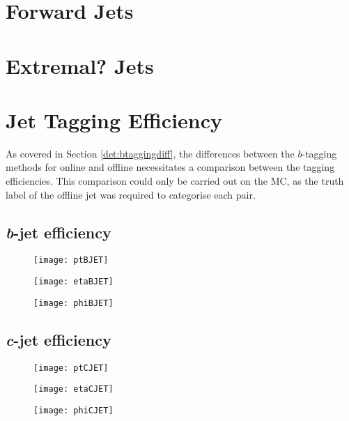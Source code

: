 \section{Forward Jets}

\section{Extremal?  Jets}

\section{Jet Tagging Efficiency}

	As covered in Section \ref{det:btaggingdiff}, the differences between the $b$-tagging methods for online and offline necessitates a comparison between the tagging efficiencies. This comparison could only be carried out on the MC, as the truth label of the offline jet was required to categorise each pair.
	
	\newpage
	\subsection{\textit{b}-jet efficiency} 
	
		\begin{figure}[h]
			\centering
			\begin{minipage}[h]{0.31\linewidth}
				\texttt{[image: ptBJET]}
				
			\end{minipage}
			\quad
			\begin{minipage}[h]{0.31\linewidth}
				\texttt{[image: etaBJET]}
			\end{minipage}
			\quad
			\begin{minipage}[h]{0.31\linewidth}
				\texttt{[image: phiBJET]}
			\end{minipage}
			\caption{ }
			\label{fig:MC:bjetefficiency}
		\end{figure}
			
	
	\subsection{\textit{c}-jet efficiency} 
	
		\begin{figure}[h]
			\centering
			\begin{minipage}[h]{0.31\linewidth}
				\texttt{[image: ptCJET]}
				
			\end{minipage}
			\quad
			\begin{minipage}[h]{0.31\linewidth}
				\texttt{[image: etaCJET]}
			\end{minipage}
			\quad
			\begin{minipage}[h]{0.31\linewidth}
				\texttt{[image: phiCJET]}
			\end{minipage}
			\caption{ }
			\label{fig:MC:cjetefficiency}
		\end{figure}
	
